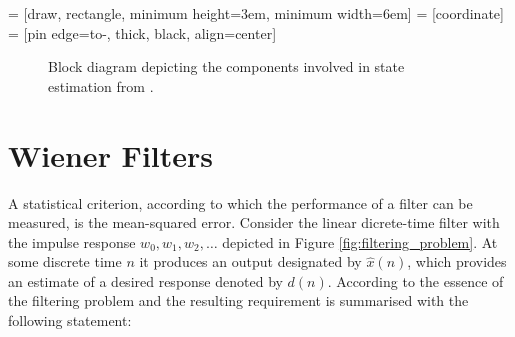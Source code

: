  = [draw, rectangle, minimum height=3em, minimum width=6em]
 = [coordinate]
 = [pin edge={to-, thick, black}, align=center]

\begin{figure}
\centering
{}
\caption{Block diagram depicting the components involved in state estimation from \cite{haykin2002adaptive}.} \label{fig:state_estimation}
\end{figure}

\section{Wiener Filters}

A statistical criterion, according to which the performance of a filter can be measured, is the mean-squared error. Consider the linear dicrete-time filter with the impulse response $w_0, w_1, w_2, \dots$ depicted in Figure \ref{fig:filtering_problem}. At some discrete time $n$ it produces an output designated by $\hat{x}(n)$, which provides an estimate of a desired response denoted by $d(n)$. According to \citeauthor{haykin2002adaptive} \cite{haykin2002adaptive} the essence of the filtering problem and the resulting requirement is summarised with the following statement:

